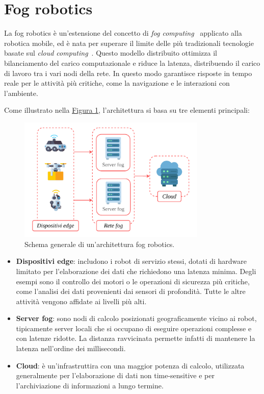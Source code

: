 \documentclass[12pt]{report}
\begin{document}
\section{Fog robotics}
\label{sec:fog_robotics}

La fog robotics è un'estensione del concetto di \textit{fog computing}~\cite{10.1145/2757384.2757397} applicato alla robotica mobile, ed è nata per superare il limite delle più tradizionali tecnologie basate sul \textit{cloud computing}~\cite{qian2009cloud}. Questo modello distribuito ottimizza il bilanciamento del carico computazionale e riduce la latenza, distribuendo il carico di lavoro tra i vari nodi della rete. In questo modo garantisce risposte in tempo reale per le attività più critiche, come la navigazione e le interazioni con l'ambiente.

Come illustrato nella \hyperref[fig:fog_robotics]{Figura \ref{fig:fog_robotics}}, l'architettura si basa su tre elementi principali:

\begin{figure}[t]
	\centering
	\includegraphics[width=0.8\textwidth, clip]{images/fog-robotics}
	\caption{Schema generale di un'architettura fog robotics.}
	\label{fig:fog_robotics}
\end{figure}

\begin{itemize}
	\item \textbf{Dispositivi edge}: includono i robot di servizio stessi, dotati di hardware limitato per l'elaborazione dei dati che richiedono una latenza minima. Degli esempi sono il controllo dei motori o le operazioni di sicurezza più critiche, come l'analisi dei dati provenienti dai sensori di profondità. Tutte le altre attività vengono affidate ai livelli più alti.
	
	\item \textbf{Server fog}: sono nodi di calcolo posizionati geograficamente vicino ai robot, tipicamente server locali che si occupano di eseguire operazioni complesse e con latenze ridotte. La distanza ravvicinata permette infatti di mantenere la latenza nell'ordine dei millisecondi.
	
	\item \textbf{Cloud}: è un'infrastruttira con una maggior potenza di calcolo, utilizzata generalmente per l'elaborazione di dati non time-sensitive e per l'archiviazione di informazioni a lungo termine.
\end{itemize}
\end{document}
